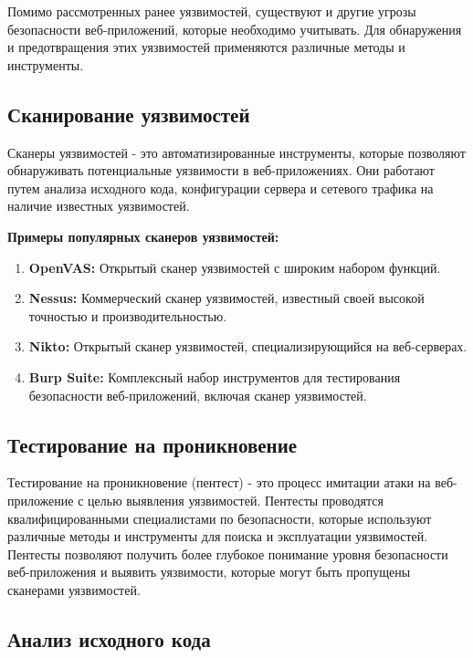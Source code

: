 \documentclass[a4paper,12pt]{diplom}
\begin{document}
	 Помимо рассмотренных ранее уязвимостей, существуют и другие угрозы безопасности веб-приложений, которые необходимо учитывать. Для обнаружения и предотвращения этих уязвимостей применяются различные методы и инструменты.
	 
	 \subsection{Сканирование уязвимостей}
	 
	 Сканеры уязвимостей - это автоматизированные инструменты, которые позволяют обнаруживать потенциальные уязвимости в веб-приложениях. Они работают путем анализа исходного кода, конфигурации сервера и сетевого трафика на наличие известных уязвимостей. 
	 
	 \textbf{Примеры популярных сканеров уязвимостей:}
	 
	 \begin{enumerate}[label=\arabic{enumi})]
	 	\item \textbf{OpenVAS:}  Открытый сканер уязвимостей с широким набором функций. 
	 	\item \textbf{Nessus:}  Коммерческий сканер уязвимостей, известный своей высокой точностью и производительностью.
	 	\item \textbf{Nikto:}  Открытый сканер уязвимостей, специализирующийся на веб-серверах. 
	 	\item \textbf{Burp Suite:}  Комплексный набор инструментов для тестирования безопасности веб-приложений, включая сканер уязвимостей.
	 \end{enumerate}
	 
	 
	 \subsection{Тестирование на проникновение}
	 
	 Тестирование на проникновение (пентест) - это процесс имитации атаки на веб-приложение с целью выявления уязвимостей.  Пентесты проводятся квалифицированными специалистами по безопасности, которые используют различные методы и инструменты для поиска и эксплуатации уязвимостей.  Пентесты позволяют получить более глубокое понимание уровня безопасности веб-приложения и выявить уязвимости, которые могут быть пропущены сканерами уязвимостей.
	 
	 \subsection{Анализ исходного кода}
	 
\end{document}
